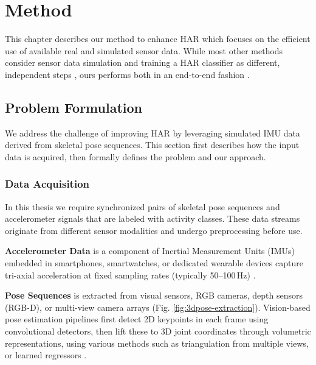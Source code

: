 \chapter{Method}
\label{chap:method}
{\renewcommand{\thefootnote}{}}

This chapter describes our method to enhance HAR which focuses on the efficient use of available real and simulated sensor data.
While most other methods consider sensor data simulation and training a HAR classifier as different, independent steps \cite{kwon2020imutube, fortes2021translating, santhalingam2023synthetic}, ours performs both in an end-to-end fashion \cite{zolfaghari2024sensor}.

\section{Problem Formulation}
\label{sec:problem}

We address the challenge of improving HAR by leveraging simulated IMU data derived from skeletal pose sequences. This section first describes how the input data is acquired, then formally defines the problem and our approach.

\subsection{Data Acquisition}
\label{sec:data-acquisition}

In this thesis we require synchronized pairs of skeletal pose sequences and accelerometer signals that are labeled with activity classes. These data streams originate from different sensor modalities and undergo preprocessing before use.

\textbf{Accelerometer Data} is a component of Inertial Measurement Units (IMUs) embedded in smartphones, smartwatches, or dedicated wearable devices capture tri-axial acceleration at fixed sampling rates (typically 50--100\,Hz) \cite{lara2012survey, hammerla2016deep}. 

\textbf{Pose Sequences} is extracted from visual sensors, RGB cameras, depth sensors (RGB-D), or multi-view camera arrays (Fig. \ref{fig:3dpose-extraction}). Vision-based pose estimation pipelines first detect 2D keypoints in each frame using convolutional detectors, then lift these to 3D joint coordinates through volumetric representations, using various methods such as triangulation from multiple views, or learned regressors \cite{fang2022alphapose, zhu2023motionbert}.

